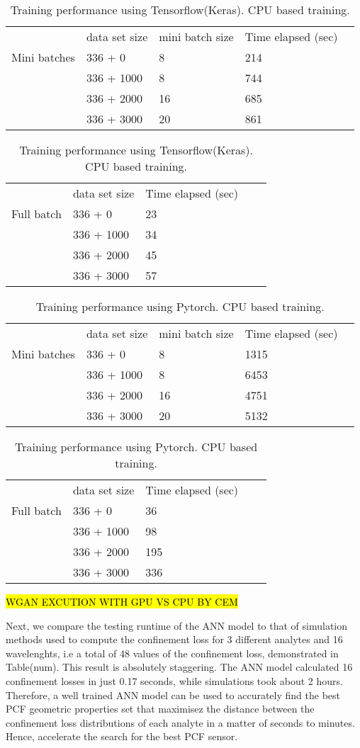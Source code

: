 \documentclass[draft, a4, 10pt, onecolumn]{IEEEtran}
\begin{document}
\begin{table}[h]
\begin{tabular}{lllll}
    & data set size & mini batch size & Time elapsed (sec) \\
Mini batches    &336 + 0 & 8 & 214 & \\
    &336 + 1000 & 8 & 744 & \\
    &336 + 2000 & 16 & 685  & \\ 
    &336 + 3000 & 20 & 861  & \\
\end{tabular}
\begin{tabular}{lllll}
   & data set size & Time elapsed (sec) \\
Full batch    &336 + 0 &  23 & \\
    &336 + 1000 &  34 & \\
    &336 + 2000 &  45 & \\ 
    &336 + 3000 &  57 & \\
\end{tabular}
\caption{Training performance using Tensorflow(Keras). CPU based training.}
\end{table}
\begin{table}[h]
\begin{tabular}{lllll}
 & data set size & mini batch size & Time elapsed (sec) \\
Mini batches    & 336 + 0 & 8 & 1315 & \\
    & 336 + 1000 & 8 & 6453  & \\
    & 336 + 2000 & 16 & 4751  & \\ 
    & 336 + 3000 & 20 & 5132 & \\
\end{tabular}
\begin{tabular}{lllll}
   &data set size & Time elapsed (sec) \\
   Full batch &336 + 0 &  36  & \\
    & 336 + 1000 &  98  & \\
    & 336 + 2000 &  195  & \\ 
    & 336 + 3000 &  336  & \\
\end{tabular}
\caption{Training performance using Pytorch. CPU based training.}
\end{table}

\hl{WGAN EXCUTION WITH GPU VS CPU BY CEM}

Next, we compare the testing runtime of the ANN model to that of simulation methods used to compute the confinement loss for 3 different analytes and 16 wavelenghts, i.e a total of 48 values of the confinement loss, demonstrated in Table(num). This result is absolutely staggering. The ANN model calculated 16 confinement losses in just 0.17 seconds, while simulations took about 2 hours. Therefore, a well trained ANN model can be used to accurately find the best PCF geometric properties set that maximisez the distance between the confinement loss distributions of each analyte in a matter of seconds to minutes. Hence, accelerate the search for the best PCF sensor.
\end{document}
